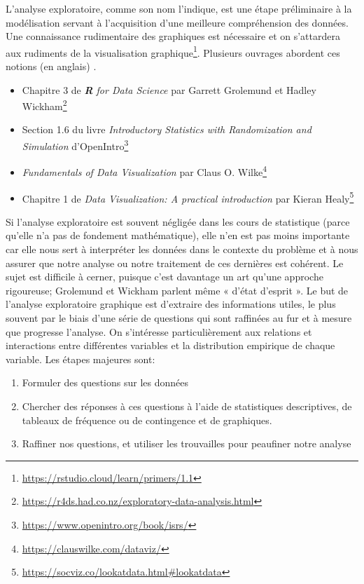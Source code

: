 \documentclass[
  11pt,
  letterpaper,
]{article}
\providecommand{\tightlist}{%
  \setlength{\itemsep}{0pt}\setlength{\parskip}{0pt}}
\renewcommand{\href}[2]{#2\footnote{\url{#1}}}
\theoremstyle{definition}
\theoremstyle{definition}
\theoremstyle{definition}
\theoremstyle{definition}
\theoremstyle{remark}
\begin{document}
L'analyse exploratoire, comme son nom l'indique, est une étape préliminaire à la modélisation servant à l'acquisition d'une meilleure compréhension des données.
Une connaissance rudimentaire des graphiques est nécessaire et on s'attardera aux \href{https://rstudio.cloud/learn/primers/1.1}{rudiments de la visualisation graphique}. Plusieurs ouvrages abordent ces notions (en anglais) .

\begin{itemize}
\tightlist
\item
  \href{https://r4ds.had.co.nz/exploratory-data-analysis.html}{Chapitre 3 de \emph{\textbf{R} for Data Science} par Garrett Grolemund et Hadley Wickham}
\item
  \href{https://www.openintro.org/book/isrs/}{Section 1.6 du livre \emph{Introductory Statistics with Randomization and Simulation} d'OpenIntro}
\item
  \href{https://clauswilke.com/dataviz/}{\emph{Fundamentals of Data Visualization} par Claus O. Wilke}
\item
  \href{https://socviz.co/lookatdata.html\#lookatdata}{Chapitre 1 de \emph{Data Visualization: A practical introduction} par Kieran Healy}
\end{itemize}

Si l'analyse exploratoire est souvent négligée dans les cours de statistique (parce qu'elle n'a pas de fondement mathématique), elle n'en est pas moins importante car elle nous sert à interpréter les données dans le contexte du problème et à nous assurer que notre analyse ou notre traitement de ces dernières est cohérent. Le sujet est difficile à cerner, puisque c'est davantage un art qu'une approche rigoureuse; Grolemund et Wickham parlent même « d'état d'esprit ». Le but de l'analyse exploratoire graphique est d'extraire des informations utiles, le plus souvent par le biais d'une série de questions qui sont raffinées au fur et à mesure que progresse l'analyse. On s'intéresse particulièrement aux relations et interactions entre différentes variables et la distribution empirique de chaque variable. Les étapes majeures sont:

\begin{enumerate}
\def\labelenumi{\arabic{enumi}.}
\tightlist
\item
  Formuler des questions sur les données
\item
  Chercher des réponses à ces questions à l'aide de statistiques descriptives, de tableaux de fréquence ou de contingence et de graphiques.
\item
  Raffiner nos questions, et utiliser les trouvailles pour peaufiner notre analyse
\end{enumerate}
\end{document}
